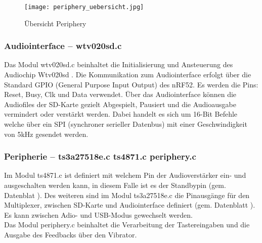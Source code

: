 \begin{figure}[htb]
\begin{center}
\texttt{[image: periphery\_uebersicht.jpg]}
\caption{Übersicht Periphery} %
\label{fig:p_uebersicht}
\end{center}
\end{figure}

\subsubsection{Audiointerface -- wtv020sd.c}
Das Modul wtv020sd.c beinhaltet die Initialisierung und Ansteuerung des Audiochip Wtv020sd \cite{WTV020}. Die Kommunikation zum Audiointerface erfolgt über die Standard GPIO (General Purpose Input Output) des nRF52. Es werden die Pins: Reset, Busy, Clk und Data verwendet. Über das Audiointerface können die Audiofiles der SD-Karte gezielt Abgespielt, Pausiert und die Audioausgabe vermindert oder verstärkt werden. Dabei handelt es sich um 16-Bit Befehle welche über ein SPI (synchroner serieller Datenbus) mit einer Geschwindigkeit von 5kHz gesendet werden.

\subsubsection{Peripherie -- ts3a27518e.c ts4871.c periphery.c }

Im Modul ts4871.c ist definiert mit welchem Pin der Audioverstärker ein- und ausgeschalten werden kann, in diesem Falle ist es der Standbypin (gem. Datenblat \cite{TS4871}). Des weiteren sind im Modul ts3a27518e.c die Pinausgänge für den Multiplexer, zwischen SD-Karte und Audiointerface definiert (gem. Datenblatt \cite{TS3A27518E}). Es kann zwischen Adio- und USB-Modus gewechselt werden.\\
Das Modul periphery.c beinhaltet die Verarbeitung der Tastereingaben und die Ausgabe des Feedbacks über den Vibrator.
